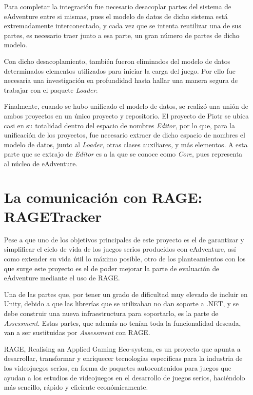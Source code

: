 Para completar la integración fue necesario desacoplar partes del sistema de eAdventure entre si mismas, pues el modelo de datos de dicho sistema está extremadamente interconectado, y cada vez que se intenta reutilizar una de sus partes, es necesario traer junto a esa parte, un gran número de partes de dicho modelo. 

Con dicho desacoplamiento, también fueron eliminados del modelo de datos determinados elementos utilizados para iniciar la carga del juego. Por ello fue necesaria una investigación en profundidad hasta hallar una manera segura de trabajar con el paquete \textit{Loader}.

Finalmente, cuando se hubo unificado el modelo de datos, se realizó una unión de ambos proyectos en un único proyecto y repositorio. El proyecto de Piotr se ubica casi en su totalidad dentro del espacio de nombres \textit{Editor}, por lo que, para la unificación de los proyectos, fue necesario extraer de dicho espacio de nombres el modelo de datos, junto al \textit{Loader}, otras clases auxiliares, y más elementos. A esta parte que se extrajo de \textit{Editor} es a la que se conoce como \textit{Core}, pues representa al núcleo de eAdventure.

\newpage

\section{La comunicación con RAGE: RAGETracker}
\label{ragetrackerit2}

Pese a que uno de los objetivos principales de este proyecto es el de garantizar y simplificar el ciclo de vida de los juegos serios producidos con eAdventure, así como extender su vida útil lo máximo posible, otro de los planteamientos con los que surge este proyecto es el de poder mejorar la parte de evaluación de eAdventure mediante el uso de RAGE.

Una de las partes que, por tener un grado de dificultad muy elevado de incluir en Unity, debido a que las librerías que se utilizaban no dan soporte a .NET, y se debe construir una nueva infraestructura para soportarlo, es la parte de \textit{Assessment}. Estas partes, que además no tenían toda la funcionalidad deseada, van a ser sustituidas por \textit{Assessment} con RAGE.

RAGE, Realising an Applied Gaming Eco-system, es un proyecto que apunta a desarrollar, transformar y enriquecer tecnologías específicas para la industria de los videojuegos serios, en forma de paquetes autocontenidos para juegos que ayudan a los estudios de videojuegos en el desarrollo de juegos serios, haciéndolo más sencillo, rápido y eficiente económicamente.

